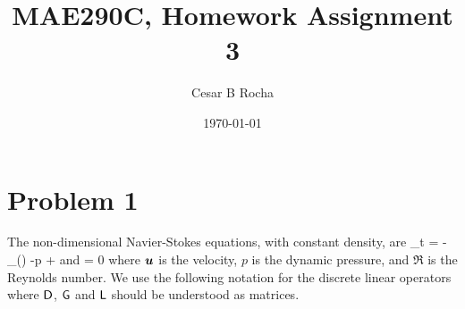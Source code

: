 \documentclass[11pt]{article}
\title{MAE290C, Homework Assignment 3}
\author{Cesar B Rocha}
\date{\today}
\begin{document}

\maketitle

\section*{Problem 1}


The non-dimensional Navier-Stokes equations, with constant density, are
\beq
\label{eq:ns1}
\p_t \bu = - \underbrace{\bu\cdot\nabla\bu}_{ \bN(\bu)}  -\nabla p + \nabla\cdot\nabla\bu\com 
\eeq
and
\beq
\label{eq:ns2}
\nabla\cdot\bu = 0\com
\eeq
where $\boldsymbol{u}$ is the velocity, $p$ is the dynamic pressure, and $\Re$ is the Reynolds number. We use the following
 notation for the discrete linear operators
 \beq
 \label{eq:defns}
    \sD \approx \nabla\cdot\com\qquad  \sG \approx\nabla \com\qqand\sL \approx \nabla\cdot\nabla\com
 \eeq   
 where $\mathsf{D}$, $\mathsf{G}$ and $\mathsf{L}$ should be understood as matrices.
\end{document}
